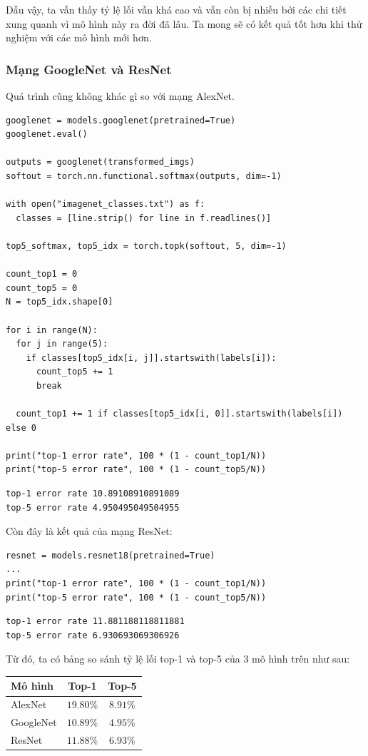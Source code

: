 \documentclass[a4paper]{article}
\begin{document}
\noindent
Dẫu vậy, ta vẫn thấy tỷ lệ lỗi vẫn khá cao và vẫn còn bị nhiễu bởi các chi tiết xung quanh vì mô hình này ra đời đã lâu. Ta mong sẽ có kết quả tốt hơn khi thử nghiệm với các mô hình mới hơn.
\subsubsection{Mạng GoogleNet và ResNet}
Quá trình cũng không khác gì so với mạng AlexNet.
\begin{lstlisting}
googlenet = models.googlenet(pretrained=True)
googlenet.eval()

outputs = googlenet(transformed_imgs)
softout = torch.nn.functional.softmax(outputs, dim=-1)

with open("imagenet_classes.txt") as f:
  classes = [line.strip() for line in f.readlines()]

top5_softmax, top5_idx = torch.topk(softout, 5, dim=-1)

count_top1 = 0
count_top5 = 0
N = top5_idx.shape[0]

for i in range(N):
  for j in range(5):
    if classes[top5_idx[i, j]].startswith(labels[i]):
      count_top5 += 1
      break

  count_top1 += 1 if classes[top5_idx[i, 0]].startswith(labels[i]) else 0

print("top-1 error rate", 100 * (1 - count_top1/N))
print("top-5 error rate", 100 * (1 - count_top5/N))
\end{lstlisting}
\begin{verbatim}
top-1 error rate 10.89108910891089
top-5 error rate 4.950495049504955
\end{verbatim}
Còn đây là kết quả của mạng ResNet:
\begin{lstlisting}
resnet = models.resnet18(pretrained=True)
...
print("top-1 error rate", 100 * (1 - count_top1/N))
print("top-5 error rate", 100 * (1 - count_top5/N))
\end{lstlisting}
\begin{verbatim}
top-1 error rate 11.881188118811881
top-5 error rate 6.930693069306926
\end{verbatim}
Từ đó, ta có bảng so sánh tỷ lệ lỗi top-1 và top-5 của 3 mô hình trên như sau:
\begin{table}[!h]
\centering
{\renewcommand{\arraystretch}{1}
\begin{tabular}{|l|c|c|}
\hline
\textbf{Mô hình} & \textbf{Top-1} & \textbf{Top-5} \\ \hline
AlexNet          & $19.80\%$              & $8.91\%$              \\ \hline
GoogleNet        & $\mathbf{10.89\%}$              & $\mathbf{4.95\%}$              \\ \hline
ResNet           & $11.88\%$              & $6.93\%$              \\ \hline
\end{tabular}}
\end{table}
\end{document}
